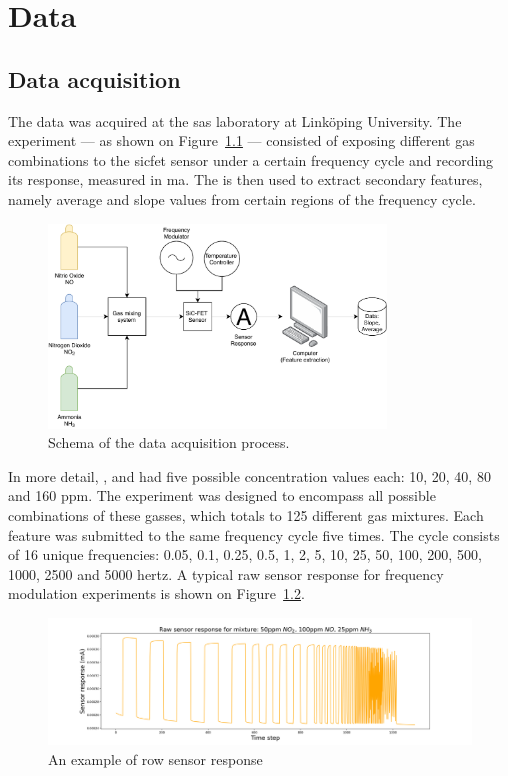 \chapter{Data}
\label{cha:data}

\section{Data acquisition}
\label{sec:data-acquisition}

The data was acquired at the \acrfull{sas} laboratory at Linköping University. The experiment --- as shown on Figure~\ref{fig:experimental-setup} --- consisted of exposing different gas combinations to the \acrshort{sicfet} sensor under a certain frequency cycle and recording its response, measured in \acrfull{ma}. The is then used to extract secondary features, namely average and slope values from certain regions of the frequency cycle.

\begin{figure}[!htb]
	\centering
	\includegraphics[width=0.8\textwidth]{../figures/experimental-setup.pdf}
	\caption{Schema of the data acquisition process.}
	\label{fig:experimental-setup}
\end{figure}

In more detail, ,  and  had five possible concentration values each: 10, 20, 40, 80 and 160 \acrfull{ppm}. The experiment was designed to encompass all possible combinations of these gasses, which totals to 125 different gas mixtures. Each feature was submitted to the same frequency cycle five times. The cycle consists of 16 unique frequencies: 0.05, 0.1, 0.25, 0.5, 1, 2, 5, 10, 25, 50, 100, 200, 500, 1000, 2500 and 5000 \acrfull{hertz}. A typical raw sensor response for frequency modulation experiments is shown on Figure~\ref{fig:raw}.

\begin{figure}[!htb]
	\centering
	\includegraphics[width=1\textwidth]{../figures/raw-response.png}
	\caption{An example of row sensor response}
	\label{fig:raw}
\end{figure}

